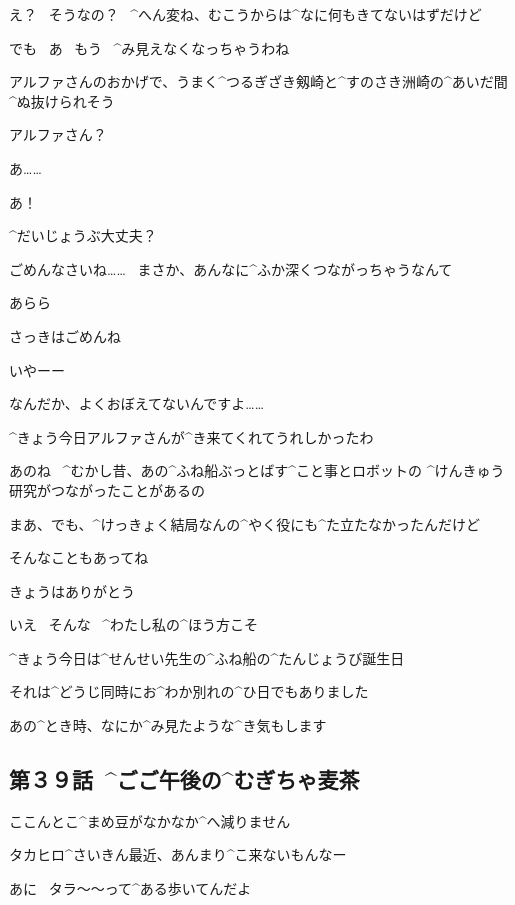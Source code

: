 \Sensei え？
\ そうなの？
\ ^{へん}{変}ね、むこうからは^{なに}{何}もきてないはずだけど

\Sensei でも
\ あ
\ もう
\ ^{み}{見}えなくなっちゃうわね

\page[87]
\Sensei アルファさんのおかげで、うまく^{つるぎざき}{剱崎}と^{すのさき}{洲崎}の^{あいだ}{間}^{ぬ}{抜}けられそう

\Sensei アルファさん？

\page[94]
\Alpha あ……

\Sensei あ！

\Sensei ^{だいじょうぶ}{大丈夫}？

\Sensei ごめんなさいね……
\ まさか、あんなに^{ふか}{深}くつながっちゃうなんて

\page[95]
\Sensei あらら

\page[96]
\Sensei さっきはごめんね

\Alpha いやーー

\Alpha なんだか、よくおぼえてないんですよ……

\Sensei ^{きょう}{今日}アルファさんが^{き}{来}てくれてうれしかったわ

\Sensei あのね
\ ^{むかし}{昔}、あの^{ふね}{船}ぶっとばす^{こと}{事}とロボットの
^{けんきゅう}{研究}がつながったことがあるの

\Sensei まあ、でも、^{けっきょく}{結局}なんの^{やく}{役}にも^{た}{立}たなかったんだけど

\Sensei そんなこともあってね

\page[97]
\Sensei きょうはありがとう

\Alpha いえ
\ そんな
\ ^{わたし}{私}の^{ほう}{方}こそ

\Alpha ^{きょう}{今日}は^{せんせい}{先生}の^{ふね}{船}の^{たんじょうび}{誕生日}

\Alpha それは^{どうじ}{同時}にお^{わか}{別}れの^{ひ}{日}でもありました

\page[98]
\Alpha あの^{とき}{時}、なにか^{み}{見}たような^{き}{気}もします


\subsection{第３９話\ ^{ごご}{午後}の^{むぎちゃ}{麦茶}}

\page[100]
\Alpha ここんとこ^{まめ}{豆}がなかなか^{へ}{減}りません

\page[101]
\Alpha タカヒロ^{さいきん}{最近}、あんまり^{こ}{来}ないもんなー

\page[103]
\Takahiro あに
\ タラ〜〜って^{ある}{歩}いてんだよ

